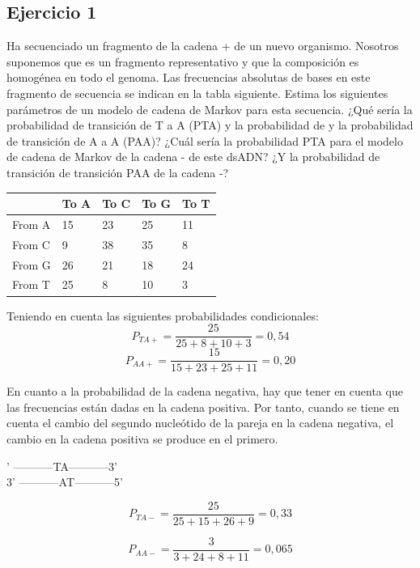 \subsection{Ejercicio 1}
Ha secuenciado un fragmento de la cadena + de un nuevo organismo. Nosotros suponemos que es un fragmento representativo y que la composición es homogénea en todo el genoma. Las frecuencias absolutas de bases en este fragmento de secuencia se indican en la tabla siguiente. Estima los siguientes parámetros de un modelo de cadena de Markov para esta secuencia. ¿Qué sería la probabilidad de transición de T a A (PTA) y la probabilidad de y la probabilidad de transición de A a A (PAA)? ¿Cuál sería la probabilidad PTA para el modelo de cadena de Markov de la cadena - de este dsADN? ¿Y la probabilidad de transición de transición PAA de la cadena -?
\begin{table}[htbp]
    \centering
    \begin{tabularx}{\textwidth}{ X | X X X X}
          & To A & To C & To G & To T \\ \hline
         From A & 15 & 23 & 25 & 11 \\
         From C & 9 & 38 & 35 & 8 \\
         From G & 26 & 21 & 18 & 24 \\
         From T & 25 & 8 & 10 & 3 \\
    \end{tabularx}
\end{table}
Teniendo en cuenta las siguientes probabilidades condicionales:
$$P_{TA+} = \frac{25}{25 + 8 + 10 + 3} = 0,54 $$
$$P_{AA+} = \frac{15}{15 + 23 + 25 + 11} = 0,20 $$

En cuanto a la probabilidad de la cadena negativa, hay que tener en cuenta que las frecuencias están dadas en la cadena positiva. Por tanto, cuando se tiene en cuenta el cambio del segundo nucleótido de la pareja en la cadena negativa, el cambio en la cadena positiva se produce en el primero. \\

\begin{table}[htbp]
' -----------TA-----------3' \\
3' -----------AT-----------5' \\
\end{table}

$$P_{TA-} = \frac{25}{25 + 15 + 26 + 9} = 0,33 $$

$$P_{AA-} = \frac{3}{3 + 24 + 8 + 11} = 0,065 $$

